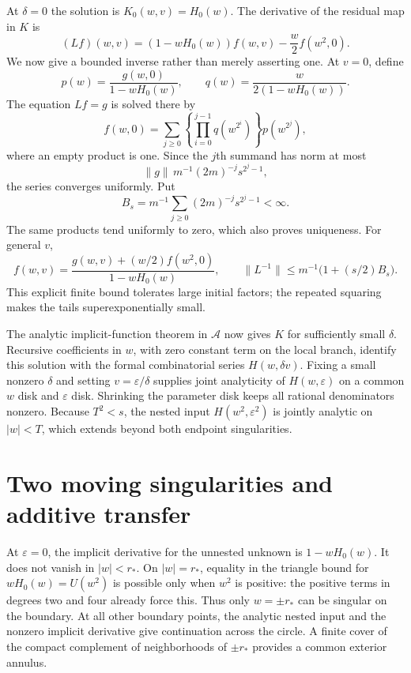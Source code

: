 \documentclass[11pt,letterpaper]{article}
\numberwithin{equation}{section}
\theoremstyle{definition}\newtheorem{definition}[theorem]{Definition}
\theoremstyle{remark}\newtheorem{remark}[theorem]{Remark}
\newcommand{\eps}{\varepsilon}
\begin{document}
At $\delta=0$ the solution is $K_0(w,v)=H_0(w)$. The derivative of the residual map in $K$ is
\begin{equation}\label{gal:ep:eq:operator}
(Lf)(w,v)=(1-wH_0(w))f(w,v)-\frac w2 f(w^2,0).
\end{equation}
We now give a bounded inverse rather than merely asserting one. At $v=0$, define
\[
p(w)=\frac{g(w,0)}{1-wH_0(w)},\qquad
q(w)=\frac{w}{2(1-wH_0(w))}.
\]
The equation $Lf=g$ is solved there by
\begin{equation}\label{gal:ep:eq:inverse}
f(w,0)=\sum_{j\ge0}\left\{\prod_{i=0}^{j-1}q(w^{2^i})\right\}p(w^{2^j}),
\end{equation}
where an empty product is one. Since the $j$th summand has norm at most
\[
\|g\|\,m^{-1}(2m)^{-j}s^{2^j-1},
\]
the series converges uniformly. Put
\begin{equation}\label{gal:ep:eq:bound}
B_s=m^{-1}\sum_{j\ge0}(2m)^{-j}s^{2^j-1}<\infty.
\end{equation}
The same products tend uniformly to zero, which also proves uniqueness. For general $v$,
\[
f(w,v)=\frac{g(w,v)+(w/2)f(w^2,0)}{1-wH_0(w)},
\qquad
\|L^{-1}\|\le m^{-1}\bigl(1+(s/2)B_s\bigr).
\]
This explicit finite bound tolerates large initial factors; the repeated squaring makes the tails superexponentially small.

The analytic implicit-function theorem in $\mathcal A$ now gives $K$ for sufficiently small $\delta$. Recursive coefficients in $w$, with zero constant term on the local branch, identify this solution with the formal combinatorial series $H(w,\delta v)$. Fixing a small nonzero $\delta$ and setting $v=\eps/\delta$ supplies joint analyticity of $H(w,\eps)$ on a common $w$ disk and $\eps$ disk. Shrinking the parameter disk keeps all rational denominators nonzero. Because $T^2<s$, the nested input $H(w^2,\eps^2)$ is jointly analytic on $|w|<T$, which extends beyond both endpoint singularities.

\section{Two moving singularities and additive transfer}\label{gal:ep:sec:transfer}
At $\eps=0$, the implicit derivative for the unnested unknown is $1-wH_0(w)$. It does not vanish in $|w|<r_*$. On $|w|=r_*$, equality in the triangle bound for $wH_0(w)=U(w^2)$ is possible only when $w^2$ is positive: the positive terms in degrees two and four already force this. Thus only $w=\pm r_*$ can be singular on the boundary. At all other boundary points, the analytic nested input and the nonzero implicit derivative give continuation across the circle. A finite cover of the compact complement of neighborhoods of $\pm r_*$ provides a common exterior annulus.
\end{document}
